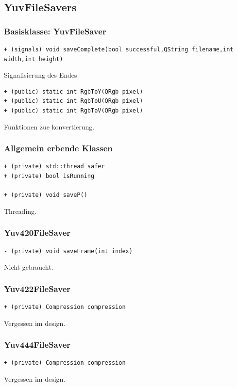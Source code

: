 \documentclass[parskip=full]{scrartcl}
\begin{document}
\subsection{YuvFileSavers}
\subsubsection{Basisklasse: YuvFileSaver}
\begin{verbatim}
+ (signals) void saveComplete(bool successful,QString filename,int width,int height)
\end{verbatim}
Signalisierung des Endes
\begin{verbatim}
+ (public) static int RgbToY(QRgb pixel)
+ (public) static int RgbToU(QRgb pixel)
+ (public) static int RgbToV(QRgb pixel)
\end{verbatim}
Funktionen zue konvertierung.
\subsubsection{Allgemein erbende Klassen}
\begin{verbatim}
+ (private) std::thread safer
+ (private) bool isRunning

+ (private) void saveP()
\end{verbatim}
Threading.
\subsubsection{Yuv420FileSaver}
\begin{verbatim}
- (private) void saveFrame(int index)
\end{verbatim}
Nicht gebraucht.
\subsubsection{Yuv422FileSaver}
\begin{verbatim}
+ (private) Compression compression
\end{verbatim}
Vergessen im design.
\subsubsection{Yuv444FileSaver}
\begin{verbatim}
+ (private) Compression compression
\end{verbatim}
Vergessen im design.
\end{document}

